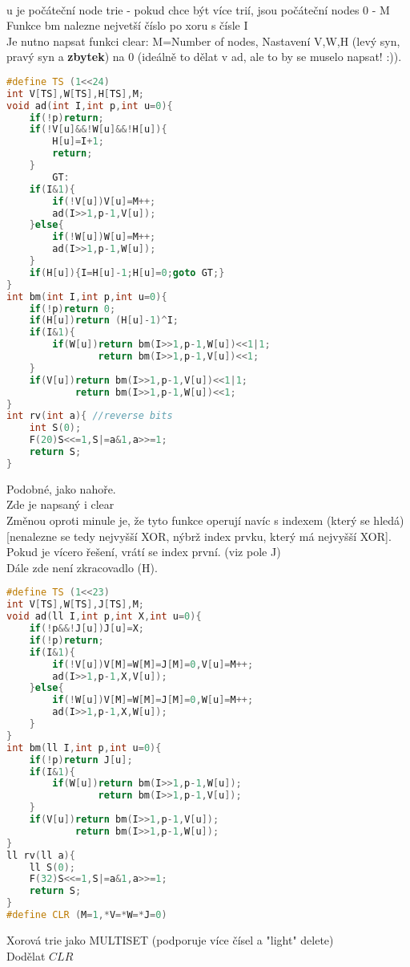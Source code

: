 \documentclass[11pt]{article}
\begin{document}
\\u je počáteční node trie - pokud chce být více trií, jsou počáteční nodes 0 - M
\\Funkce bm nalezne nejvetší číslo po xoru s čísle \textsf{I}
\\Je nutno napsat funkci clear: M=Number of nodes, Nastavení \textsf{V},\textsf{W},\textsf{H} (levý syn, pravý syn a \textbf{zbytek}) na 0 (ideálně to dělat v ad, ale to by se muselo napsat! :)).
\begin{lstlisting}[language=C++]
#define TS (1<<24)
int V[TS],W[TS],H[TS],M;
void ad(int I,int p,int u=0){
    if(!p)return;
    if(!V[u]&&!W[u]&&!H[u]){
        H[u]=I+1;
        return;
    }
        GT:
    if(I&1){
        if(!V[u])V[u]=M++;
        ad(I>>1,p-1,V[u]);
    }else{
        if(!W[u])W[u]=M++;
        ad(I>>1,p-1,W[u]);
    }
    if(H[u]){I=H[u]-1;H[u]=0;goto GT;}
}
int bm(int I,int p,int u=0){
    if(!p)return 0;
    if(H[u])return (H[u]-1)^I;
    if(I&1){
        if(W[u])return bm(I>>1,p-1,W[u])<<1|1;
                return bm(I>>1,p-1,V[u])<<1;
    }
    if(V[u])return bm(I>>1,p-1,V[u])<<1|1;
            return bm(I>>1,p-1,W[u])<<1;
}
int rv(int a){ //reverse bits
    int S(0);
    F(20)S<<=1,S|=a&1,a>>=1;
    return S;
}
\end{lstlisting}
Podobné, jako nahoře.
\\Zde je napsaný i clear
\\Změnou oproti minule je, že tyto funkce operují navíc s indexem (který se hledá) [nenalezne se tedy nejvyšší XOR, nýbrž index prvku, který má nejvyšší XOR]. Pokud je vícero řešení, vrátí se index první. (viz pole \textsf{J}) \\Dále zde není zkracovadlo (H).
\begin{lstlisting}[language=C++]
#define TS (1<<23)
int V[TS],W[TS],J[TS],M;
void ad(ll I,int p,int X,int u=0){
    if(!p&&!J[u])J[u]=X;
    if(!p)return;
    if(I&1){
        if(!V[u])V[M]=W[M]=J[M]=0,V[u]=M++;
        ad(I>>1,p-1,X,V[u]);
    }else{
        if(!W[u])V[M]=W[M]=J[M]=0,W[u]=M++;
        ad(I>>1,p-1,X,W[u]);
    }
}
int bm(ll I,int p,int u=0){
    if(!p)return J[u];
    if(I&1){
        if(W[u])return bm(I>>1,p-1,W[u]);
                return bm(I>>1,p-1,V[u]);
    }
    if(V[u])return bm(I>>1,p-1,V[u]);
            return bm(I>>1,p-1,W[u]);
}
ll rv(ll a){
    ll S(0);
    F(32)S<<=1,S|=a&1,a>>=1;
    return S;
}
#define CLR (M=1,*V=*W=*J=0)
\end{lstlisting}
Xorová trie jako MULTISET (podporuje více čísel a "light" delete)
\\Dodělat $CLR$
\end{document}
